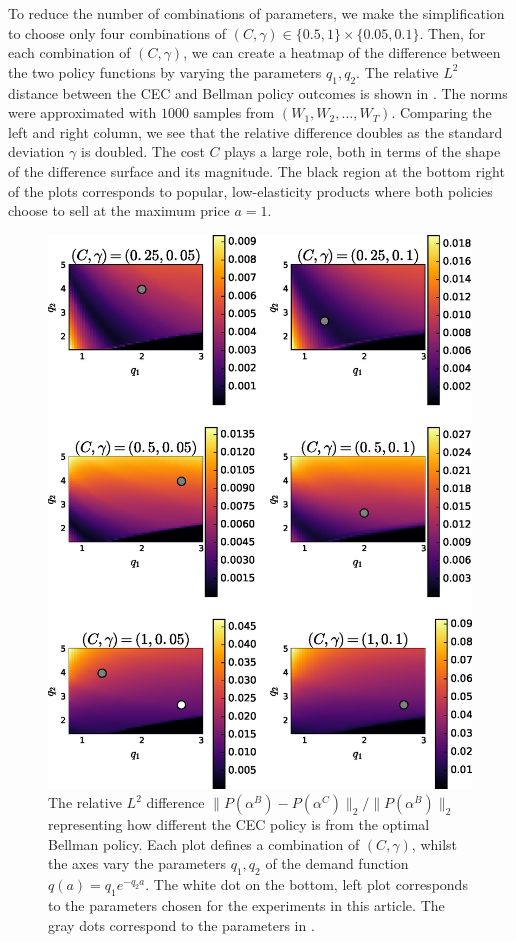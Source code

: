 \documentclass[main.tex]{subfiles}
\begin{document}
To reduce the number of combinations of parameters, we make the
simplification to choose only
four combinations of
$(C,\gamma)\in\{0.5,1\}\times\{0.05,0.1\}$.
Then,
for each combination of $(C,\gamma)$,
we can create a heatmap of the difference between the two policy
functions by varying the parameters $q_1,q_2$.
The relative $L^2$ distance between the CEC and Bellman policy outcomes
is shown in . The norms were approximated
with $1000$ samples from $(W_1,W_2,\dots,W_T)$.
Comparing the left and right column, we see that the relative difference doubles as
the standard deviation $\gamma$ is doubled. The cost $C$ plays a large
role, both in terms of the shape of the difference surface and its
magnitude.
The black region at the bottom right of the plots corresponds to popular,
low-elasticity products where both policies choose to sell at the
maximum price $a=1$.
\begin{figure}[htbp]
  \includegraphics[width=\textwidth]{./img/profit_diff_heatmaps}
  \caption{The relative $L^2$ difference
    $\|P(\alpha^B)-P(\alpha^C)\|_2/\|P(\alpha^B)\|_2$ representing
    how different the CEC policy is from the optimal Bellman policy.
    Each plot defines a combination of $(C,\gamma)$, whilst
    the axes vary the parameters $q_1,q_2$ of the demand function
    $q(a)=q_1e^{-q_2a}$.
    The white dot on the bottom, left plot corresponds to the
    parameters chosen for the experiments in this article. The gray
    dots correspond to the parameters in .
  }\label{fig:profit_diff_heatmaps}
\end{figure}
\end{document}

